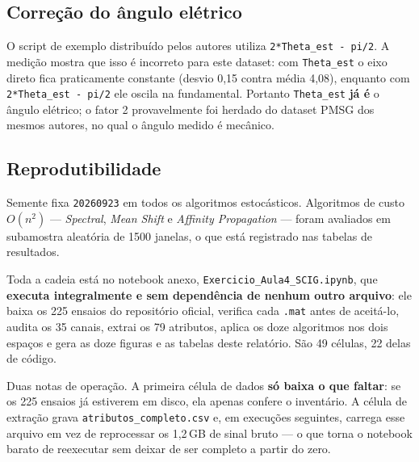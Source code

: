\documentclass[12pt,a4paper]{article}
\begin{document}
\subsection*{Correção do ângulo elétrico}

O script de exemplo distribuído pelos autores utiliza \texttt{2*Theta\_est - pi/2}. A medição mostra que isso é incorreto para este dataset: com \texttt{Theta\_est} o eixo direto fica praticamente constante (desvio 0,15 contra média 4,08), enquanto com \texttt{2*Theta\_est - pi/2} ele oscila na fundamental. Portanto \texttt{Theta\_est} \textbf{já é} o ângulo elétrico; o fator 2 provavelmente foi herdado do dataset PMSG dos mesmos autores, no qual o ângulo medido é mecânico.

\subsection*{Reprodutibilidade}

Semente fixa \texttt{20260923} em todos os algoritmos estocásticos. Algoritmos de custo $O(n^2)$ --- \emph{Spectral}, \emph{Mean Shift} e \emph{Affinity Propagation} --- foram avaliados em subamostra aleatória de 1500 janelas, o que está registrado nas tabelas de resultados.

Toda a cadeia está no notebook anexo, \texttt{Exercicio\_Aula4\_SCIG.ipynb}, que \textbf{executa integralmente e sem dependência de nenhum outro arquivo}: ele baixa os 225 ensaios do repositório oficial, verifica cada \texttt{.mat} antes de aceitá-lo, audita os 35 canais, extrai os 79 atributos, aplica os doze algoritmos nos dois espaços e gera as doze figuras e as tabelas deste relatório. São 49 células, 22 delas de código.

Duas notas de operação. A primeira célula de dados \textbf{só baixa o que faltar}: se os 225 ensaios já estiverem em disco, ela apenas confere o inventário. A célula de extração grava \texttt{atributos\_completo.csv} e, em execuções seguintes, carrega esse arquivo em vez de reprocessar os 1,2\,GB de sinal bruto --- o que torna o notebook barato de reexecutar sem deixar de ser completo a partir do zero.
\end{document}
